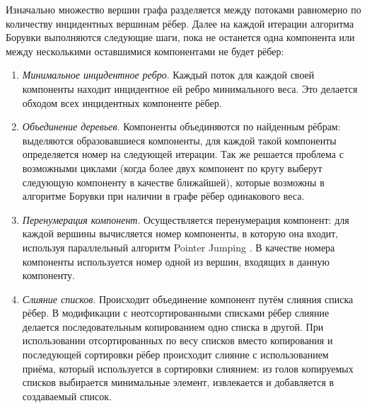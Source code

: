 \documentclass[a4paper,10pt]{extarticle}
\begin{document}
Изначально множество вершин графа разделяется между потоками равномерно по количеству инцидентных вершинам рёбер.
Далее на каждой итерации алгоритма Борувки выполняются следующие шаги, пока не останется одна компонента или между несколькими оставшимися компонентами не будет рёбер:
\begin{enumerate}
    \item \textit{Минимальное инцидентное ребро}.
        Каждый поток для каждой своей компоненты находит инцидентное ей ребро минимального веса. Это делается обходом всех инцидентных компоненте рёбер.
    \item \textit{Объединение деревьев}.
        Компоненты объединяются по найденным рёбрам: выделяются образовавшиеся компоненты, для каждой такой компоненты определяется номер на следующей итерации.
          Так же решается проблема с возможными циклами (когда более двух компонент по кругу выберут следующую компоненту в качестве ближайшей), которые возможны в алгоритме Борувки при наличии в графе рёбер одинакового веса.
    \item \textit{Перенумерация компонент}.
          Осуществляется перенумерация компонент: для каждой вершины вычисляется номер компоненты, в которую она входит, используя параллельный алгоритм Pointer Jumping \cite{pointer-jumping}. В качестве номера компоненты используется номер одной из вершин, входящих в данную компоненту.
    \item \textit{Слияние списков}.
        Происходит объединение компонент путём слияния списка рёбер. В модификации с неотсортированными списками рёбер слияние делается последовательным копированием одно списка в другой. При использовании отсортированных по весу списков вместо копирования и последующей сортировки рёбер происходит слияние с использованием приёма, который используется в сортировки слиянием: из голов копируемых списков выбирается минимальные элемент, извлекается и добавляется в создаваемый список.
\end{enumerate}
\end{document}
